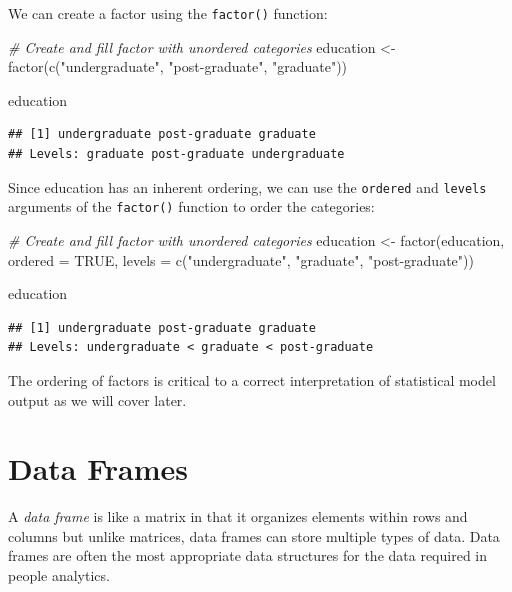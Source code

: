 \documentclass[
]{book}
\newenvironment{Shaded}{\begin{snugshade}}{\end{snugshade}}
\newcommand{\AttributeTok}[1]{\textcolor[rgb]{0.77,0.63,0.00}{#1}}
\newcommand{\CommentTok}[1]{\textcolor[rgb]{0.56,0.35,0.01}{\textit{#1}}}
\newcommand{\ConstantTok}[1]{\textcolor[rgb]{0.00,0.00,0.00}{#1}}
\newcommand{\FunctionTok}[1]{\textcolor[rgb]{0.00,0.00,0.00}{#1}}
\newcommand{\NormalTok}[1]{#1}
\newcommand{\OtherTok}[1]{\textcolor[rgb]{0.56,0.35,0.01}{#1}}
\newcommand{\StringTok}[1]{\textcolor[rgb]{0.31,0.60,0.02}{#1}}
\begin{document}
We can create a factor using the \texttt{factor()} function:

\begin{Shaded}
\begin{Highlighting}[]
\CommentTok{\# Create and fill factor with unordered categories}
\NormalTok{education }\OtherTok{\textless{}{-}} \FunctionTok{factor}\NormalTok{(}\FunctionTok{c}\NormalTok{(}\StringTok{"undergraduate"}\NormalTok{, }\StringTok{"post{-}graduate"}\NormalTok{, }\StringTok{"graduate"}\NormalTok{))}

\NormalTok{education}
\end{Highlighting}
\end{Shaded}

\begin{verbatim}
## [1] undergraduate post-graduate graduate     
## Levels: graduate post-graduate undergraduate
\end{verbatim}

Since education has an inherent ordering, we can use the \texttt{ordered} and \texttt{levels} arguments of the \texttt{factor()} function to order the categories:

\begin{Shaded}
\begin{Highlighting}[]
\CommentTok{\# Create and fill factor with unordered categories}
\NormalTok{education }\OtherTok{\textless{}{-}} \FunctionTok{factor}\NormalTok{(education, }\AttributeTok{ordered =} \ConstantTok{TRUE}\NormalTok{, }\AttributeTok{levels =} \FunctionTok{c}\NormalTok{(}\StringTok{"undergraduate"}\NormalTok{, }\StringTok{"graduate"}\NormalTok{, }\StringTok{"post{-}graduate"}\NormalTok{))}

\NormalTok{education}
\end{Highlighting}
\end{Shaded}

\begin{verbatim}
## [1] undergraduate post-graduate graduate     
## Levels: undergraduate < graduate < post-graduate
\end{verbatim}

The ordering of factors is critical to a correct interpretation of statistical model output as we will cover later.

\hypertarget{data-frames}{%
\section{Data Frames}\label{data-frames}}

A \emph{data frame} is like a matrix in that it organizes elements within rows and columns but unlike matrices, data frames can store multiple types of data. Data frames are often the most appropriate data structures for the data required in people analytics.
\end{document}
